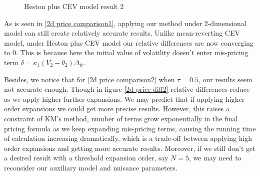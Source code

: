 \begin{figure}[ht]
  \centering
  \hfill
  \caption{Heston plus CEV model result 2}
\end{figure}

As is seen in \ref{2d price comparison1}, applying our method under 2-dimensional model can still create relatively accurate results. Unlike mean-reverting CEV model, under Heston plus CEV model our relative differences are now converging to 0. This is because here the initial value of volatility doesn't enter mis-pricing term $\delta = \kappa_1(V_2-\theta_2) \Delta_{\bar{w}}$.

Besides, we notice that for \ref{2d price comparison2} when $\tau=0.5$, our results seem not accurate enough. Though in figure \ref{2d price diff2} relative differences reduce as we apply higher further expansions. We may predict that if applying higher order expansions we could get more precise results. However, this raises a constraint of KM's method, number of terms grow exponentially in the final pricing formula as we keep expanding mis-pricing terms, causing the running time of calculation increasing dramatically, which is a trade-off between applying high order expansions and getting more accurate results. Moreover, if we still don't get a desired result with a threshold expansion order, say $N=5$, we may need to reconsider our auxiliary model and nuisance parameters.

